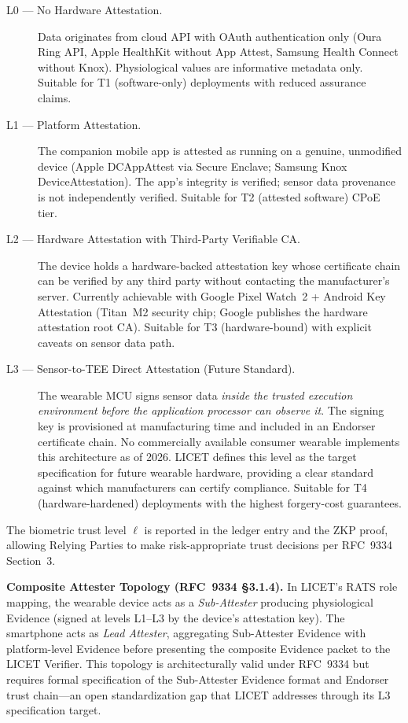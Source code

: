 \documentclass[12pt,a4paper]{article}
\begin{document}
\begin{description}
  \item[L0 — No Hardware Attestation.] Data originates from cloud API with
  OAuth authentication only (Oura Ring API, Apple HealthKit without App
  Attest, Samsung Health Connect without Knox). Physiological values are
  informative metadata only. Suitable for T1 (software-only) deployments with
  reduced assurance claims.

  \item[L1 — Platform Attestation.] The companion mobile app is attested as
  running on a genuine, unmodified device (Apple DCAppAttest via Secure
  Enclave; Samsung Knox DeviceAttestation). The app's integrity is verified;
  sensor data provenance is not independently verified. Suitable for T2
  (attested software) CPoE tier.

  \item[L2 — Hardware Attestation with Third-Party Verifiable CA.] The device
  holds a hardware-backed attestation key whose certificate chain can be
  verified by any third party without contacting the manufacturer's server.
  Currently achievable with Google Pixel Watch~2 + Android Key Attestation
  (Titan~M2 security chip; Google publishes the hardware attestation root CA).
  Suitable for T3 (hardware-bound) with explicit caveats on sensor data path.

  \item[L3 — Sensor-to-TEE Direct Attestation (Future Standard).] The
  wearable MCU signs sensor data \emph{inside the trusted execution
  environment before the application processor can observe it}. The signing
  key is provisioned at manufacturing time and included in an Endorser
  certificate chain. No commercially available consumer wearable implements
  this architecture as of 2026. LICET defines this level as the target
  specification for future wearable hardware, providing a clear standard
  against which manufacturers can certify compliance. Suitable for T4
  (hardware-hardened) deployments with the highest forgery-cost guarantees.
\end{description}

The biometric trust level $\ell$ is reported in the ledger entry and the ZKP
proof, allowing Relying Parties to make risk-appropriate trust decisions per
RFC~9334 Section~3.

\textbf{Composite Attester Topology (RFC~9334 §3.1.4).} In LICET's RATS
role mapping, the wearable device acts as a \emph{Sub-Attester} producing
physiological Evidence (signed at levels L1--L3 by the device's attestation
key). The smartphone acts as \emph{Lead Attester}, aggregating Sub-Attester
Evidence with platform-level Evidence before presenting the composite Evidence
packet to the LICET Verifier. This topology is architecturally valid under
RFC~9334 but requires formal specification of the Sub-Attester Evidence format
and Endorser trust chain---an open standardization gap that LICET addresses
through its L3 specification target.
\end{document}
